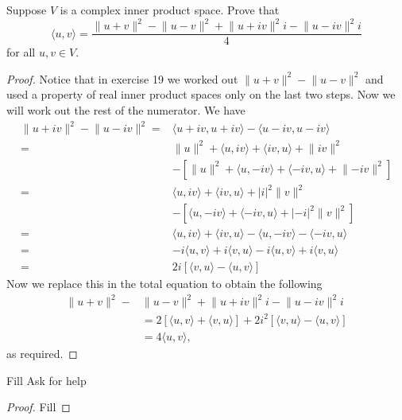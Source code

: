 \begin{exercise}{20}
  Suppose $V$ is a complex inner product space. Prove that
  \[
  \langle u,v\rangle =\frac{\lVert u+v\rVert^2-\lVert u-v\rVert^2+\lVert u+iv\rVert^2i-\lVert u-iv\rVert^2i}{4}
  \]
  for all $u,v\in V$.
\end{exercise}
\begin{proof}
 Notice that in exercise 19 we worked out $\lVert u+v\rVert^2-\lVert u-v\rVert^2$ and used a property of real inner product spaces only on the last two steps. Now we will work out the rest of the numerator. We have 
 \begin{align*}
     \lVert u+iv\rVert^2-\lVert u-iv\rVert^2 =& \langle u+iv, u+iv\rangle- \langle u-iv,u-iv\rangle\\
     =& \lVert u\rVert^2 +\langle u, iv\rangle +\langle iv,u\rangle +\lVert iv\rVert^2\\
     &-[\lVert u\rVert^2+\langle u,-iv\rangle+\langle -iv,u\rangle+\lVert -iv\rVert^2]\\
     =& \langle u, iv\rangle +\langle iv,u\rangle +\lvert i\rvert^2\lVert v\rVert^2\\
     &-[\langle u,-iv\rangle+\langle -iv,u\rangle+\lvert -i\rvert^2\lVert v\rVert^2]\\
     =& \langle u, iv\rangle +\langle iv,u\rangle -\langle u,-iv\rangle-\langle -iv,u\rangle\\
     =& -i\langle u,v\rangle +i\langle v, u\rangle -i\langle u,v\rangle +i\langle v,u\rangle\\
     =& 2i[\langle v,u\rangle-\langle u,v\rangle]
 \end{align*}
 Now we replace this in the total equation to obtain the following
 \begin{align*}
     \lVert u+v\rVert^2-&\lVert u-v\rVert^2+\lVert u+iv\rVert^2i-\lVert u-iv\rVert^2i\\ &= 2[\langle u,v\rangle +\langle v,u\rangle] + 2i^2[\langle v,u\rangle-\langle u,v\rangle]\\
     &= 4\langle u,v\rangle,
 \end{align*}
 as required.
\end{proof}

\begin{exercise}{21}
  Fill Ask for help
\end{exercise}
\begin{proof}
 Fill
\end{proof}